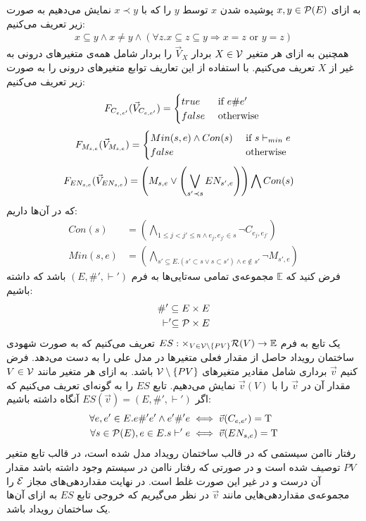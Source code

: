 به ازای
$x,y \in \mathcal{P}(E)$
پوشیده
شدن
$x$
توسط
$y$
را که با
$x \prec y$
نمایش می‌دهیم به صورت زیر تعریف می‌کنیم:
\begin{align*}
    x \subseteq y \wedge x \neq y \wedge
    (\forall z. x \subseteq z \subseteq y \Rightarrow x = z
    \text{ or } y = z)
\end{align*}
همچنین به ازای هر متغیر
$X \in \mathcal{V}$
بردار
$\vec V_X$
را بردار شامل همه‌ی متغیر‌های درونی به غیر از
$X$
تعریف می‌کنیم.
با استفاده از این تعاریف
توابع متغیر‌های درونی را به صورت زیر تعریف می‌کنیم:
$$
    F_{C_{e,e'}}(\vec V_{C_{e,e'}}) = \begin{cases}
        true  & \text{ if } e \# e' \\
        false & \text{ otherwise }
    \end{cases}
$$
$$
    F_{M_{s,e}}(\vec V_{M_{s,e}}) = \begin{cases}
        Min(s,e) \wedge Con(s) & \text{ if } s \vdash_{min} e \\
        false                  & \text{ otherwise }
    \end{cases}
$$
\begin{align*}
    F_{EN_{s,e}}(\vec V_{EN_{s,e}}) & =
    \left(
    M_{s,e} \vee
    \left(
    \bigvee_{s'\prec s}EN_{s',e}
    \right)
    \right)
    \bigwedge
    Con(s)
\end{align*}
که در آن‌ها داریم:
\begin{align*}
    Con(s)   & =   \left(
    \bigwedge_{ 1\leq j<j' \leq n \wedge e_j,e_{j'} \in s}
    \neg C_{e_j,e_{j'}}
    \right)               \\
    Min(s,e) & = \left(
    \bigwedge_{s' \subseteq E. (s' \subset s \vee s \subset s')
        \wedge e \notin s'}
    \neg M_{s',e}
    \right)
\end{align*}
فرض کنید که
$\mathbb{E}$
مجموعه‌ی تمامی سه‌تایی‌ها به فرم
$(E,\#',\vdash')$
باشد که داشته باشیم:
\begin{align*}
    \#' \subseteq E \times E \\
    \vdash' \subseteq \mathcal{P}\times E
\end{align*}
یک تابع به فرم
$ES: \times_{V \in \mathcal{V}\setminus \{PV\}} \mathcal{R}(V) \rightarrow \mathbb{E}$
تعریف می‌کنیم که به صورت شهودی ساختمان رویداد حاصل از مقدار فعلی متغیر‌ها در مدل علی را به دست می‌دهد.
فرض کنیم
$\vec v$
برداری شامل مقادیر متغیرهای
$\mathcal{V} \setminus \{PV\}$
باشد.
به ازای هر متغیر مانند
$V \in \mathcal{V}$
مقدار آن در
$\vec v$
را با
$\vec v(V)$
نمایش می‌دهیم.
تابع
$ES$
را به گونه‌ای تعریف می‌کنیم که اگر
$ES(\vec v) = (E,\#',\vdash')$
آنگاه داشته باشیم:
\begin{align*}
    \forall e,e' \in E. e \#' e' \wedge e' \#' e
     & \iff \vec{v}(C_{e,e'}) = \mathrm{T} \\
    \forall s \in \mathcal{P}(E), e \in E.  s \vdash' e
     & \iff \vec{v}(EN_{s,e}) = \mathrm{T}
\end{align*}
رفتار نا‌امن
سیستمی که در قالب ساختمان رویداد مدل شده است، در قالب تابع متغیر
$PV$
توصیف شده است و در صورتی که رفتار نا‌امن در سیستم وجود داشته باشد مقدار آن درست و در غیر این صورت غلط است.
در نهایت مقداردهی‌های مجاز
$\mathcal{E}$
را مجموعه‌ی مقداردهی‌هایی مانند
$\vec v$
در نظر می‌گیریم که خروجی تابع
$ES$
به ازای آن‌ها یک ساختمان رویداد باشد.

